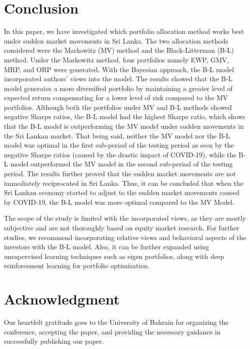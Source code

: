 \documentclass[conference]{IEEEtran}
\begin{document}
\section{Conclusion}
In this paper, we have investigated which portfolio allocation method works best under sudden market movements in Sri Lanka. The two allocation methods considered were the Markowitz (MV) method and the Black-Litterman (B-L) method. Under the Markowitz method, four portfolios namely EWP, GMV, MRP, and ORP were generated. With the Bayesian approach, the B-L model incorporated authors’ views into the model. The results showed that the B-L model generates a more diversified portfolio by maintaining a greater level of expected return compensating for a lower level of risk compared to the MV portfolios. Although both the portfolios under MV and B-L methods showed negative Sharpe ratios, the B-L model had the highest Sharpe ratio, which shows that the B-L model is outperforming the MV model under sudden movements in the Sri Lankan market. That being said, neither the MV model nor the B-L model was optimal in the first sub-period of the testing period as seen by the negative Sharpe ratios (caused by the drastic impact of COVID-19), while the B-L model outperformed the MV model in the second sub-period of the testing period. The results further proved that the sudden market movements are not immediately reciprocated in Sri Lanka. Thus, it can be concluded that when the Sri Lankan economy started to adjust to the sudden market movements caused by COVID-19, the B-L model was more optimal compared to the MV Model.

The scope of the study is limited with the incorporated views, as they are mostly subjective and are not thoroughly based on equity market research. For further studies, we recommend incorporating relative views and behavioral aspects of the investors with the B-L model. Also, it can be further expanded using unsupervised learning techniques such as eigen portfolios, along with deep reinforcement learning for portfolio optimization.

\section*{Acknowledgment}

Our heartfelt gratitude goes to the University of Bahrain for organizing the conference, accepting the paper, and providing the necessary guidance in successfully publishing our paper. 
\end{document}
